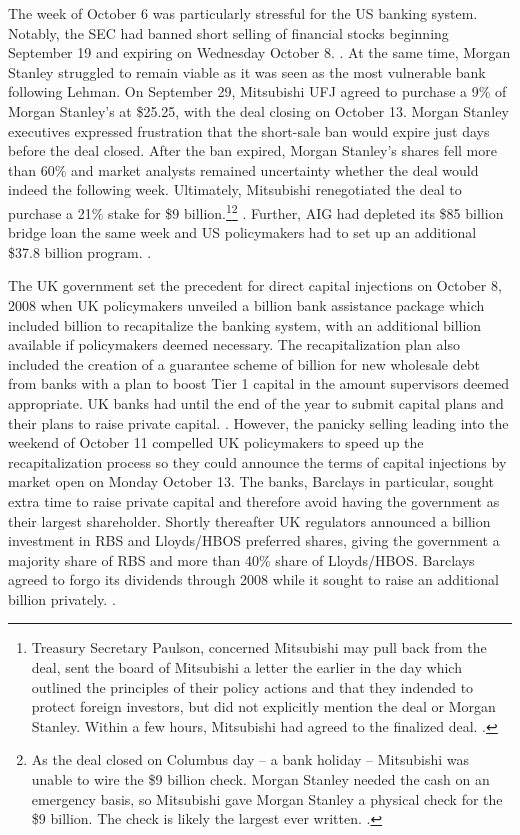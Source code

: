 \documentclass[12pt]{article}
\begin{document}
The week of October 6 was particularly stressful for the US banking system. Notably, the SEC had banned short selling of financial stocks beginning September 19 and expiring on Wednesday October 8. \citep{shortban}. At the same time, Morgan Stanley struggled to remain viable as it was seen as the most vulnerable bank following Lehman. On September 29, Mitsubishi UFJ agreed to purchase a 9\% of Morgan Stanley's at \$25.25, with the deal closing on October 13. Morgan Stanley executives expressed frustration that the short-sale ban would expire just days before the deal closed. After the ban expired, Morgan Stanley's shares fell more than 60\% and market analysts remained uncertainty whether the deal would indeed the following week. Ultimately, Mitsubishi renegotiated the deal to purchase a 21\% stake for \$9 billion.\footnote{Treasury Secretary Paulson, concerned Mitsubishi may pull back from the deal, sent the board of Mitsubishi a letter the earlier in the day which outlined the principles of their policy actions and that they indended to protect foreign investors, but did not explicitly mention the deal or Morgan Stanley. Within a few hours, Mitsubishi had agreed to the finalized deal. \citep{paulsonbook}.}\footnote{As the deal closed on Columbus day -- a bank holiday -- Mitsubishi was unable to wire the \$9 billion check. Morgan Stanley needed the cash on an emergency basis, so Mitsubishi gave Morgan Stanley a physical check for the \$9 billion. The check is likely the largest ever written. \citep{Sorkin}.} \citep{MUFGMS}. Further, AIG had depleted its \$85 billion bridge loan the same week and US policymakers had to set up an additional \$37.8 billion program. \citep{Geithner}.

The UK government set the precedent for direct capital injections on October 8, 2008 when UK policymakers unveiled a  billion bank assistance package which included  billion to recapitalize the banking system, with an additional  billion available if policymakers deemed necessary. The recapitalization plan also included the creation of a guarantee scheme of  billion for new wholesale debt from banks with a plan to boost Tier 1 capital in the amount supervisors deemed appropriate. UK banks had until the end of the year to submit capital plans and their plans to raise private capital. \citep{UKPlans}. However, the panicky selling leading into the weekend of October 11 compelled UK policymakers to speed up the recapitalization process so they could announce the terms of capital injections by market open on Monday October 13. The banks, Barclays in particular, sought extra time to raise private capital and therefore avoid having the government as their largest shareholder. Shortly thereafter UK regulators announced a  billion investment in RBS and Lloyds/HBOS preferred shares, giving the government a majority share of RBS and more than 40\% share of Lloyds/HBOS. Barclays agreed to forgo its dividends through 2008 while it sought to raise an additional  billion privately. \citep{UKActual}.
\end{document}
